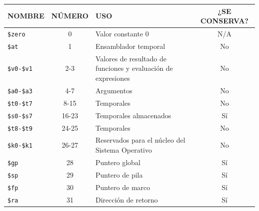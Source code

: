 \documentclass[12pt,a4paper]{article}
\begin{document}
		\begin{table}[H]
			\centering
			\small
			\begin{tabularx}{\textwidth}{l c X c}
				\toprule
				\textbf{NOMBRE} & \textbf{NÚMERO} & \textbf{USO} & \textbf{¿SE CONSERVA?} \\
				\midrule
				\texttt{\$zero} & 0 & Valor constante 0 & N/A \\
				\texttt{\$at} & 1 & Ensamblador temporal & No \\
				\texttt{\$v0-\$v1} & 2-3 & Valores de resultado de funciones y evaluación de expresiones & No \\
				\texttt{\$a0-\$a3} & 4-7 & Argumentos & No \\
				\texttt{\$t0-\$t7} & 8-15 & Temporales & No \\
				\texttt{\$s0-\$s7} & 16-23 & Temporales almacenados & Sí \\
				\texttt{\$t8-\$t9} & 24-25 & Temporales & No \\
				\texttt{\$k0-\$k1} & 26-27 & Reservados para el núcleo del Sistema Operativo & No \\
				\texttt{\$gp} & 28 & Puntero global & Sí \\
				\texttt{\$sp} & 29 & Puntero de pila & Sí \\
				\texttt{\$fp} & 30 & Puntero de marco & Sí \\
				\texttt{\$ra} & 31 & Dirección de retorno & Sí \\
				\bottomrule
			\end{tabularx}
		\end{table}
		
	
\end{document}
